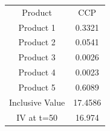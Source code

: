 \begin{tabular}{cc}
Product & CCP \\
Product 1 & 0.3321 \\
Product 2 & 0.0541 \\
Product 3 & 0.0026 \\
Product 4 & 0.0023 \\
Product 5 & 0.6089 \\
Inclusive Value & 17.4586 \\
IV at t=50 & 16.974 \\
\end{tabular}